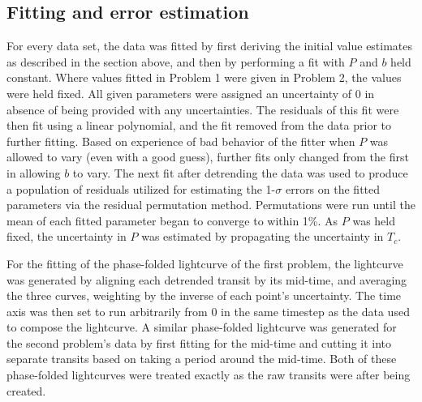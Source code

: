 \documentclass[10pt, preprint]{aastex}
\begin{document}
\subsection{Fitting and error estimation}
For every data set, the data was fitted by first deriving the initial value estimates as described in the section above, and then by performing a fit with $P$ and $b$ held constant. Where values fitted in Problem 1 were given in Problem 2, the values were held fixed. All given parameters were assigned an uncertainty of 0 in absence of being provided with any uncertainties. The residuals of this fit were then fit using a linear polynomial, and the fit removed from the data prior to further fitting. Based on experience of bad behavior of the fitter when $P$ was allowed to vary (even with a good guess), further fits only changed from the first in allowing $b$ to vary. The next fit after detrending the data was used to produce a population of residuals utilized for estimating the 1-$\sigma$ errors on the fitted parameters via the residual permutation method. Permutations were run until the mean of each fitted parameter began to converge to  within 1\%. As $P$ was held fixed, the uncertainty in $P$ was estimated by propagating the uncertainty in $T_c$.

For the fitting of the phase-folded lightcurve of the first problem, the lightcurve was generated by aligning each detrended transit by its mid-time, and averaging the three curves, weighting by the inverse of each point's uncertainty. The time axis was then set to run arbitrarily from 0 in the same timestep as the data used to compose the lightcurve. A similar phase-folded lightcurve was generated for the second problem's data by first fitting for the mid-time and cutting it into separate transits based on taking a period around the mid-time. Both  of these phase-folded lightcurves were treated exactly as the raw transits were after being created.
\end{document}

